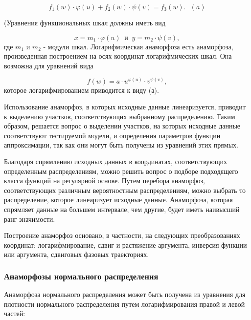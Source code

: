 \documentclass[
  14,
]{article}
\begin{document}
\[
f_1( w) \cdot φ(u) + f_2 (w) \cdot ψ(v) = f_3(w). \ \ \ (a)
\]

(Уравнения функциональных шкал должны иметь вид

\[
x = m_1 \cdot φ(u)\ \text{ и }\ y = m_2 \cdot ψ (v) , 
\] где \(m_1\) и \(m_2\) - модули шкал. Логарифмическая анаморфоза есть
анаморфоза, произведенная построением на осях координат логарифмических
шкал. Она возможна для уравнений вида

\[
f (w) = a \cdot  u^{φ(u)} \cdot v^{ψ(v)} ,
\] которое логарифмированием приводится к виду (а).

Использование анаморфоз, в которых исходные данные линеаризуется,
приводит к выделению участков, соответствующих выбранному распределению.
Таким образом, решается вопрос о выделении участков, на которых исходные
данные соответствуют тестируемой модели, и определения параметров
функции аппроксимации, так как они могут быть получены из уравнений этих
прямых.

Благодаря спрямлению исходных данных в координатах, соответствующих
определенным распределениям, можно решить вопрос о подборе подходящего
класса функций на регулярной основе. Путем перебора анаморфоз,
соответствующих различным вероятностным распределениям, можно выбрать то
распределение, которое линеаризует исходные данные. Анаморфоза, которая
спрямляет данные на большем интервале, чем другие, будет иметь наивысший
ранг значимости.

Построение анаморфоз основано, в частности, на следующих преобразованиях
координат: логарифмирование, сдвиг и растяжение аргумента, инверсия
функции или аргумента, сдвиговых фазовых траекториях.

\hypertarget{ux430ux43dux430ux43cux43eux440ux444ux43eux437ux44b-ux43dux43eux440ux43cux430ux43bux44cux43dux43eux433ux43e-ux440ux430ux441ux43fux440ux435ux434ux435ux43bux435ux43dux438ux44f}{%
\subsubsection{\texorpdfstring{\textbf{Анаморфозы нормального
распределения}}{Анаморфозы нормального распределения}}\label{ux430ux43dux430ux43cux43eux440ux444ux43eux437ux44b-ux43dux43eux440ux43cux430ux43bux44cux43dux43eux433ux43e-ux440ux430ux441ux43fux440ux435ux434ux435ux43bux435ux43dux438ux44f}}

Анаморфоза нормального распределения может быть получена из уравнения
для плотности нормального распределения путем логарифмирования правой и
левой частей:
\end{document}
